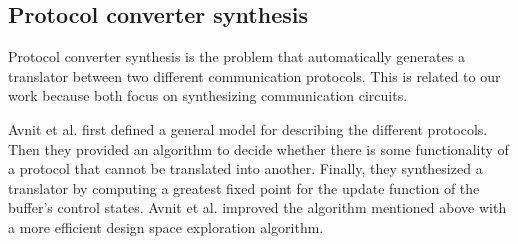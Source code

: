 \documentclass[journal]{IEEEtran}
\begin{document}
{%
%
%
%
%
%
%


\subsection{Protocol converter synthesis}
Protocol converter synthesis is the problem that automatically generates a translator between two different communication protocols.
This is related to our work because both focus on synthesizing communication circuits.

Avnit et al. \cite{converter_date08,converter_todeas09} first defined a general model for describing the different protocols.
Then they provided an algorithm to decide
whether there is some functionality of a protocol that cannot be translated into another.
Finally,
they synthesized a translator by computing a greatest fixed point for the update function of the buffer's control states.
Avnit et al.\cite{converter_date09} improved the algorithm mentioned above with a more efficient design space exploration algorithm.

}
\end{document}
